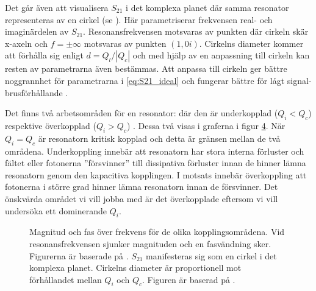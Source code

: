\documentclass[main.tex]{subfiles}
\begin{document}
Det går även att visualisera $S_{21}$ i det komplexa planet där samma resonator representeras av en cirkel (se ). Här parametriserar frekvensen real- och imaginärdelen av $S_{21}$. Resonansfrekvensen motsvaras av punkten där cirkeln skär x-axeln och $f=\pm\infty$ motsvaras av punkten $(1,0i)$. Cirkelns diameter kommer att förhålla sig enligt $d=Q_l/|Q_c|$ och med hjälp av en anpassning till cirkeln kan resten av parametrarna även bestämmas. Att anpassa till cirkeln ger bättre noggrannhet för parametrarna i \ref{eq:S21_ideal} och fungerar bättre för lågt signal-brusförhållande \cite{Probst2015}.

Det finns två arbetsområden för en resonator: där den är underkopplad ($Q_i<Q_c$) respektive överkopplad ($Q_i>Q_c$) \cite{Boehme2016}. Dessa två visas i graferna i figur \ref{fig:ex_cmplx}. När $Q_i=Q_c$ är resonatorn kritisk kopplad och detta är gränsen mellan de två områdena. Underkoppling innebär att resonatorn har stora interna förluster och fältet eller fotonerna ''försvinner'' till dissipativa förluster innan de hinner lämna resonatorn genom den kapacitiva kopplingen. I motsats innebär överkoppling att fotonerna i större grad hinner lämna resonatorn innan de försvinner. Det önskvärda området vi vill jobba med är det överkopplade eftersom vi vill undersöka ett dominerande $Q_i$.




\begin{figure}[H]
    \begin{subfigure}[b]{0.329\textwidth}
        \centering
        \setlength{}
        \setlength\figureheight{\figurewidth}
        
        \caption{}
        \label{subfig:mag}
    \end{subfigure}
    \begin{subfigure}[b]{0.329\textwidth}
        \centering
        \setlength{}
        \setlength\figureheight{\figurewidth}
        
        \caption{}
         \label{subfig:fas}
    \end{subfigure}
    \begin{subfigure}[b]{0.329\textwidth}
        \centering
        \setlength{}
        \setlength\figureheight{\figurewidth}
        
        \caption{}
        \label{subfig:komp}
    \end{subfigure}
    \caption{Magnitud  och fas  över frekvens för de olika kopplingsområdena. Vid resonansfrekvensen sjunker magnituden och en fasvändning sker. Figurerna är baserade på \cite[fig. 2.4(a-c)]{Boehme2016}. $S_{21}$ manifesteras sig som en cirkel  i det komplexa planet. Cirkelns diameter är proportionell mot förhållandet mellan $Q_i$ och $Q_c$. Figuren är baserad på \cite[fig. 2.4d]{Boehme2016}.}
    \label{fig:ex_cmplx}
\end{figure}
\end{document}
